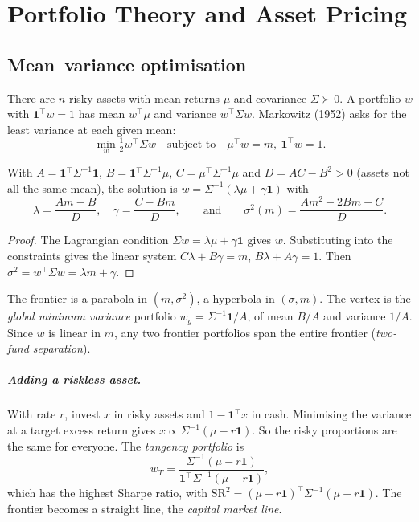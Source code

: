 \chapter{Portfolio Theory and Asset Pricing}\label{ch:port}

\section{Mean--variance optimisation}

There are $n$ risky assets with mean returns $\mu$ and covariance $\Sigma\succ0$. A portfolio $w$ with $\mathbf{1}^\top w=1$ has mean $w^\top\mu$ and variance $w^\top\Sigma w$. Markowitz (1952) asks for the least variance at each given mean:
\[
\min_w\tfrac12w^\top\Sigma w\quad\text{subject to}\quad\mu^\top w=m,\ \mathbf{1}^\top w=1.
\]

\begin{theorem}[Frontier]\label{thm:frontier}
With $A=\mathbf{1}^\top\Sigma^{-1}\mathbf{1}$, $B=\mathbf{1}^\top\Sigma^{-1}\mu$, $C=\mu^\top\Sigma^{-1}\mu$ and $D=AC-B^2>0$ (assets not all the same mean), the solution is $w=\Sigma^{-1}(\lambda\mu+\gamma\mathbf{1})$ with
\[
\lambda=\frac{Am-B}{D},\quad\gamma=\frac{C-Bm}{D},\qquad\text{and}\qquad\sigma^2(m)=\frac{Am^2-2Bm+C}{D}.
\]
\end{theorem}
\begin{proof}
The Lagrangian condition $\Sigma w=\lambda\mu+\gamma\mathbf{1}$ gives $w$. Substituting into the constraints gives the linear system $C\lambda+B\gamma=m$, $B\lambda+A\gamma=1$. Then $\sigma^2=w^\top\Sigma w=\lambda m+\gamma$.
\end{proof}

The frontier is a parabola in $(m,\sigma^2)$, a hyperbola in $(\sigma,m)$. The vertex is the \emph{global minimum variance} portfolio $w_g=\Sigma^{-1}\mathbf{1}/A$, of mean $B/A$ and variance $1/A$. Since $w$ is linear in $m$, any two frontier portfolios span the entire frontier (\emph{two-fund separation}).

\paragraph{Adding a riskless asset.} With rate $r$, invest $x$ in risky assets and $1-\mathbf{1}^\top x$ in cash. Minimising the variance at a target excess return gives $x\propto\Sigma^{-1}(\mu-r\mathbf{1})$. So the risky proportions are the same for everyone. The \emph{tangency portfolio} is
\[
w_T=\frac{\Sigma^{-1}(\mu-r\mathbf{1})}{\mathbf{1}^\top\Sigma^{-1}(\mu-r\mathbf{1})},
\]
which has the highest Sharpe ratio, with $\mathrm{SR}^2=(\mu-r\mathbf{1})^\top\Sigma^{-1}(\mu-r\mathbf{1})$. The frontier becomes a straight line, the \emph{capital market line}.

